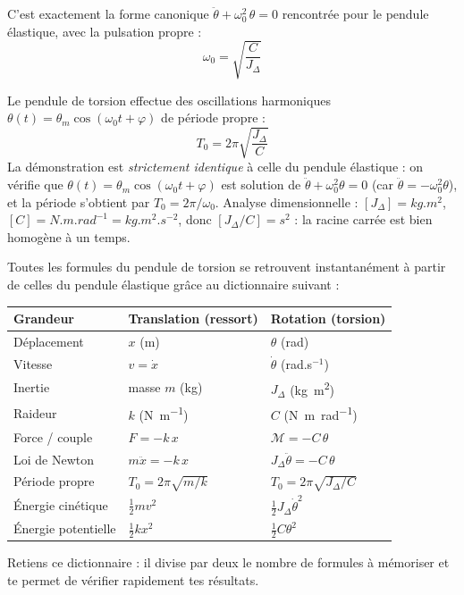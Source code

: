 \documentclass[11pt]{article}
\begin{document}
C'est exactement la forme canonique $\ddot{\theta} + \omega_0^2\,\theta = 0$ rencontrée pour le pendule élastique, avec la pulsation propre :
\[ \omega_0 = \sqrt{\frac{C}{J_\Delta}} \]

\begin{propriete}
Le pendule de torsion effectue des oscillations harmoniques $\theta(t) = \theta_m\cos(\omega_0 t + \varphi)$ de période propre :
\[ T_0 = 2\pi\sqrt{\frac{J_\Delta}{C}} \]
La démonstration est \emph{strictement identique} à celle du pendule élastique : on vérifie que $\theta(t) = \theta_m\cos(\omega_0 t + \varphi)$ est solution de $\ddot{\theta} + \omega_0^2\theta = 0$ (car $\ddot{\theta} = -\omega_0^2\theta$), et la période s'obtient par $T_0 = 2\pi/\omega_0$. Analyse dimensionnelle : $[J_\Delta] = \si{kg.m^2}$, $[C] = \si{N.m.rad^{-1}} = \si{kg.m^2.s^{-2}}$, donc $[J_\Delta/C] = \si{s^2}$ : la racine carrée est bien homogène à un temps.
\end{propriete}

\begin{methode}
Toutes les formules du pendule de torsion se retrouvent instantanément à partir de celles du pendule élastique grâce au dictionnaire suivant :
\begin{center}
\begin{tabularx}{\linewidth}{|l|X|X|}\hline
\rowcolor{popblueL} \textbf{Grandeur} & \textbf{Translation (ressort)} & \textbf{Rotation (torsion)} \\ \hline
Déplacement & $x$ (m) & $\theta$ (rad) \\ \hline
Vitesse & $v = \dot{x}$ & $\dot{\theta}$ (rad.s$^{-1}$) \\ \hline
Inertie & masse $m$ (kg) & $J_\Delta$ (\si{kg.m^2}) \\ \hline
Raideur & $k$ (\si{N.m^{-1}}) & $C$ (\si{N.m.rad^{-1}}) \\ \hline
Force / couple & $F = -k\,x$ & $\mathcal{M} = -C\,\theta$ \\ \hline
Loi de Newton & $m\ddot{x} = -k\,x$ & $J_\Delta\ddot{\theta} = -C\,\theta$ \\ \hline
Période propre & $T_0 = 2\pi\sqrt{m/k}$ & $T_0 = 2\pi\sqrt{J_\Delta/C}$ \\ \hline
Énergie cinétique & $\tfrac{1}{2}m v^2$ & $\tfrac{1}{2}J_\Delta\dot{\theta}^2$ \\ \hline
Énergie potentielle & $\tfrac{1}{2}k x^2$ & $\tfrac{1}{2}C\theta^2$ \\ \hline
\end{tabularx}
\end{center}
Retiens ce dictionnaire : il divise par deux le nombre de formules à mémoriser et te permet de vérifier rapidement tes résultats.
\end{methode}
\end{document}
